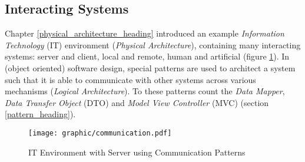 %
%
%
%
%
%
%

\subsection{Interacting Systems}
\label{interacting_systems_heading}

Chapter \ref{physical_architecture_heading} introduced an example
\emph{Information Technology} (IT) environment (\emph{Physical Architecture}),
containing many interacting systems: server and client, local and remote, human
and artificial (figure \ref{communication_figure}). In (object oriented)
software design, special patterns are used to architect a system such that it
is able to communicate with other systems across various mechanisms
(\emph{Logical Architecture}). To these patterns count the \emph{Data Mapper},
\emph{Data Transfer Object} (DTO) and \emph{Model View Controller} (MVC)
(section \ref{pattern_heading}).

\begin{figure}[ht]
    \begin{center}
        \texttt{[image: graphic/communication.pdf]}
        \caption{IT Environment with Server using Communication Patterns}
        \label{communication_figure}
    \end{center}
\end{figure}

